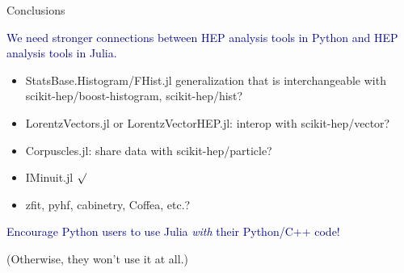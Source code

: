 \documentclass[aspectratio=169]{beamer}
\begin{document}
\begin{frame}{Conclusions}
\vspace{0.25 cm}
\LARGE
\begin{center}
\textcolor{darkblue}{We need stronger connections between HEP analysis tools in Python and HEP analysis tools in Julia.}
\end{center}

\large
\vspace{0.35 cm}
\begin{itemize}\setlength{\itemsep}{0.2 cm}
\item StatsBase.Histogram/FHist.jl generalization that is interchangeable with scikit-hep/boost-histogram, scikit-hep/hist?
\item LorentzVectors.jl or LorentzVectorHEP.jl: interop with scikit-hep/vector?
\item Corpuscles.jl: share data with scikit-hep/particle?
\item IMinuit.jl $\surd$
\item zfit, pyhf, cabinetry, Coffea, etc.?
\end{itemize}

\Large
\vspace{0.3 cm}
\begin{center}
\textcolor{darkblue}{Encourage Python users to use Julia {\it with} their Python/C++ code!}

\large (Otherwise, they won't use it at all.)
\end{center}
\end{frame}
\end{document}
